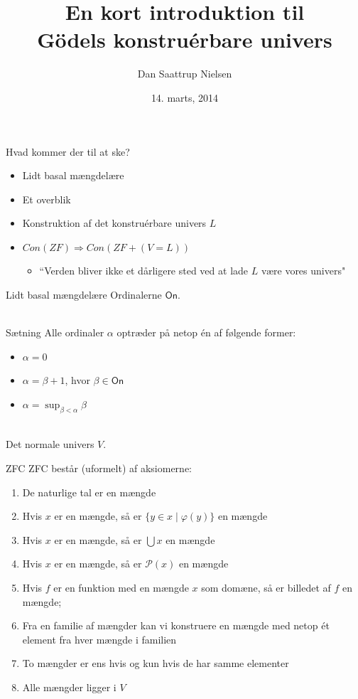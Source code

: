 \documentclass{beamer}
\title[Gödels konstruerbare univers]{En kort introduktion til\\ Gödels konstruérbare univers}
\author{Dan Saattrup Nielsen}
\date{14. marts, 2014}
\begin{document}
\begin{frame}
	\titlepage
\end{frame}

\begin{frame}{Hvad kommer der til at ske?}
	\begin{itemize}
		\pause\item Lidt basal mængdelære
		\pause\item Et overblik
		\pause\item Konstruktion af det konstruérbare univers $L$
		\pause\item $Con(ZF)\Rightarrow Con(ZF+(V=L))$
		\begin{itemize}
		\pause\item ``Verden bliver ikke et dårligere sted ved at lade $L$ være vores univers"
		\end{itemize}
	\end{itemize}
\end{frame}


\begin{frame}{Lidt basal mængdelære}
	Ordinalerne $\textsf{On}$.\\\ \\
	
	\pause\begin{block}{Sætning}
		Alle ordinaler $\alpha$ optræder på netop én af følgende former:
		\begin{itemize}
			\item $\alpha=0$
			\item $\alpha=\beta+1$, hvor $\beta\in\textsf{On}$
			\item $\alpha=\sup_{\beta<\alpha}\beta$
		\end{itemize}
	\end{block}\ \\
	
	\pause Det normale univers $V$.
\end{frame}

\begin{frame}{ZFC}
	ZFC består (uformelt) af aksiomerne:
	\begin{enumerate}		
		\pause\item De naturlige tal er en mængde
		\pause\item Hvis $x$ er en mængde, så er $\{y\in x\mid\varphi(y)\}$ en mængde
		\pause\item Hvis $x$ er en mængde, så er $\bigcup x$ en mængde
		\pause\item Hvis $x$ er en mængde, så er $\mathcal{P}(x)$ en mængde
		\pause\item Hvis $f$ er en funktion med en mængde $x$ som domæne, så er billedet af $f$ en mængde;
		\pause\item Fra en familie af mængder kan vi konstruere en mængde med netop ét element fra hver mængde i familien
		\pause\item To mængder er ens hvis og kun hvis de har samme elementer
		\pause\item Alle mængder ligger i $V$
	\end{enumerate}
\end{frame}
\end{document}
